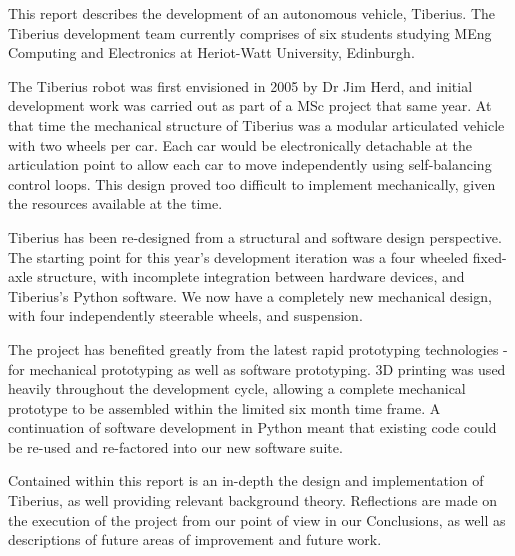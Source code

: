 This report describes the development of an autonomous vehicle, Tiberius. The Tiberius development team currently comprises of six students studying MEng Computing and Electronics at Heriot-Watt University, Edinburgh.
\newline

The Tiberius robot was first envisioned in 2005 by Dr Jim Herd, and initial development work was carried out as part of a MSc project that same year. At that time the mechanical structure of Tiberius was a modular articulated vehicle with two wheels per car. Each car would be electronically detachable at the articulation point to allow each car to move independently using self-balancing control loops. This design proved too difficult to implement mechanically, given the resources available at the time.
\newline

Tiberius has been re-designed from a structural and software design perspective. The starting point for this year's development iteration was a four wheeled fixed-axle structure, with incomplete integration between hardware devices, and Tiberius's Python software. We now have a completely new mechanical design, with four independently steerable wheels, and suspension.
\newline

The project has benefited greatly from the latest rapid prototyping technologies - for mechanical prototyping as well as software prototyping. 3D printing was used heavily throughout the development cycle, allowing a complete mechanical prototype to be assembled within the limited six month time frame. A continuation of software development in Python meant that existing code could be re-used and re-factored into our new software suite.
\newline

Contained within this report is an in-depth the design and implementation of Tiberius, as well providing relevant background theory. Reflections are made on the execution of the project from our point of view in our Conclusions, as well as descriptions of future areas of improvement and future work.

\pagebreak
